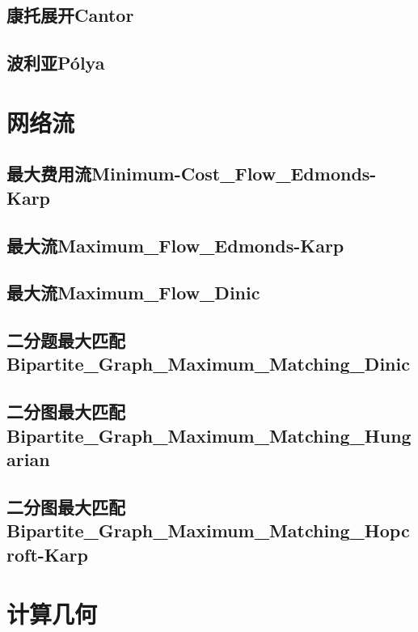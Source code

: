 \documentclass[10pt,a4paper]{article}
\begin{document}
\subsection{康托展开Cantor}

\subsection{波利亚P\'{o}lya}


\newpage
\section{网络流}
\subsection{最大费用流Minimum-Cost\_Flow\_Edmonds-Karp}

\subsection{最大流Maximum\_Flow\_Edmonds-Karp}

\subsection{最大流Maximum\_Flow\_Dinic}

\subsection{二分题最大匹配Bipartite\_Graph\_Maximum\_Matching\_Dinic}

\subsection{二分图最大匹配Bipartite\_Graph\_Maximum\_Matching\_Hungarian}

\subsection{二分图最大匹配Bipartite\_Graph\_Maximum\_Matching\_Hopcroft-Karp}


\newpage
\section{计算几何}
\end{document}
